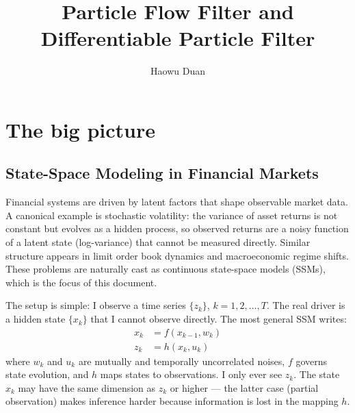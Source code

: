 \documentclass{article}
\begin{document}
\title{Particle Flow Filter and Differentiable Particle Filter}

\author{Haowu Duan}





\maketitle

\tableofcontents


\newpage
\section{The big picture}

\subsection{State-Space Modeling in Financial Markets}
Financial systems are driven by latent factors that shape observable market data. A canonical example is stochastic volatility: the variance of asset returns is not constant but evolves as a hidden process, so observed returns are a noisy function of a latent state (log-variance) that cannot be measured directly. Similar structure appears in limit order book dynamics and macroeconomic regime shifts. These problems are naturally cast as continuous state-space models (SSMs), which is the focus of this document.

The setup is simple: I observe a time series $\{z_k\}$, $k = 1, 2, \ldots, T$. The real driver is a hidden state $\{x_k\}$ that I cannot observe directly. The most general SSM writes:
\begin{equation}
\begin{split} \label{Eq:SSM}
     x_k &= f(x_{k-1}, w_k) \\
     z_k &= h(x_k, u_k)
\end{split}
\end{equation}
where $w_k$ and $u_k$ are mutually and temporally uncorrelated noises, $f$ governs state evolution, and $h$ maps states to observations. I only ever see $z_k$. The state $x_k$ may have the same dimension as $z_k$ or higher --- the latter case (partial observation) makes inference harder because information is lost in the mapping $h$.
\end{document}
